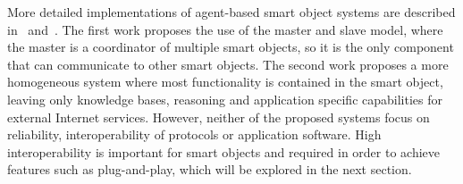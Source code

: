 


More detailed implementations of agent-based smart object systems are described in~\cite{Agent-oriented_smart_objects_development} and~\cite{Autonomous_and_Self_Controlling_Smart_Objects_for_the_Future_Internet}. The first work proposes the use of the master and slave model, where the master is a coordinator of multiple smart objects, so it is the only component that can communicate to other smart objects. The second work proposes a more homogeneous system where most functionality is contained in the smart object, leaving only knowledge bases, reasoning and application specific capabilities for external Internet services. However, neither of the proposed systems focus on reliability, interoperability of protocols or application software. High interoperability is important for smart objects and required in order to achieve features such as plug-and-play, which will be explored in the next section.



